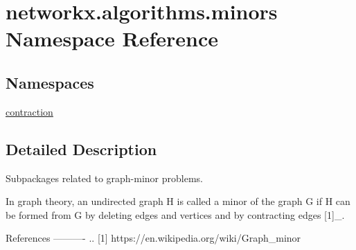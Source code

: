 \hypertarget{namespacenetworkx_1_1algorithms_1_1minors}{}\section{networkx.\+algorithms.\+minors Namespace Reference}
\label{namespacenetworkx_1_1algorithms_1_1minors}
\subsection*{Namespaces}
\begin{DoxyCompactItemize}
\item 
 \hyperlink{namespacenetworkx_1_1algorithms_1_1minors_1_1contraction}{contraction}
\end{DoxyCompactItemize}


\subsection{Detailed Description}
\begin{DoxyVerb}Subpackages related to graph-minor problems.

In graph theory, an undirected graph H is called a minor of the graph G if H
can be formed from G by deleting edges and vertices and by contracting edges
[1]_.

References
----------
.. [1] https://en.wikipedia.org/wiki/Graph_minor
\end{DoxyVerb}
 